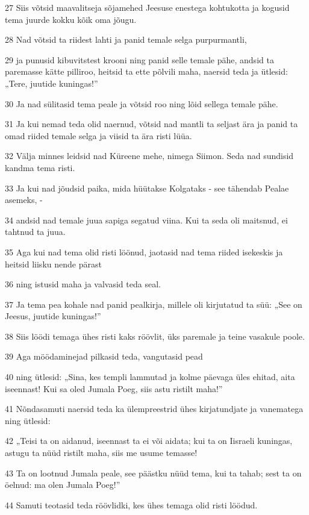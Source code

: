 \par 27 Siis võtsid maavalitseja sõjamehed Jeesuse enestega kohtukotta ja kogusid tema juurde kokku kõik oma jõugu.
\par 28 Nad võtsid ta riidest lahti ja panid temale selga purpurmantli,
\par 29 ja punusid kibuvitstest krooni ning panid selle temale pähe, andsid ta paremasse kätte pilliroo, heitsid ta ette põlvili maha, naersid teda ja ütlesid: „Tere, juutide kuningas!”
\par 30 Ja nad sülitasid tema peale ja võtsid roo ning lõid sellega temale pähe.
\par 31 Ja kui nemad teda olid naernud, võtsid nad mantli ta seljast ära ja panid ta omad riided temale selga ja viisid ta ära risti lüüa.
\par 32 Välja minnes leidsid nad Küreene mehe, nimega Siimon. Seda nad sundisid kandma tema risti.
\par 33 Ja kui nad jõudsid paika, mida hüütakse Kolgataks - see tähendab Pealae asemeks, -
\par 34 andsid nad temale juua sapiga segatud viina. Kui ta seda oli maitsnud, ei tahtnud ta juua.
\par 35 Aga kui nad tema olid risti löönud, jaotasid nad tema riided isekeskis ja heitsid liisku nende pärast
\par 36 ning istusid maha ja valvasid teda seal.
\par 37 Ja tema pea kohale nad panid pealkirja, millele oli kirjutatud ta süü: „See on Jeesus, juutide kuningas!”
\par 38 Siis löödi temaga ühes risti kaks röövlit, üks paremale ja teine vasakule poole.
\par 39 Aga möödaminejad pilkasid teda, vangutasid pead
\par 40 ning ütlesid: „Sina, kes templi lammutad ja kolme päevaga üles ehitad, aita iseennast! Kui sa oled Jumala Poeg, siis astu ristilt maha!”
\par 41 Nõndasamuti naersid teda ka ülempreestrid ühes kirjatundjate ja vanematega ning ütlesid:
\par 42 „Teisi ta on aidanud, iseennast ta ei või aidata; kui ta on Iisraeli kuningas, astugu ta nüüd ristilt maha, siis me usume temasse!
\par 43 Ta on lootnud Jumala peale, see päästku nüüd tema, kui ta tahab; sest ta on öelnud: ma olen Jumala Poeg!”
\par 44 Samuti teotasid teda röövlidki, kes ühes temaga olid risti löödud.

